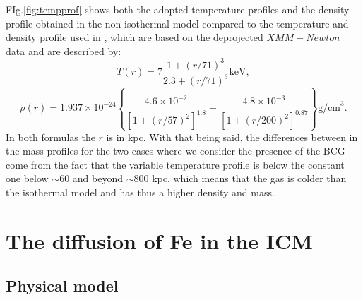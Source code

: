 \documentclass{article}
\begin{document}
FIg.\ref{fig:tempprof} shows both the adopted temperature profiles and the density profile obtained in the non-isothermal model compared to the temperature and density profile used in \cite{rebusco}, which are based on the deprojected $XMM-Newton$ data and are described by:
\begin{equation}
	T(r)=7\frac{1+(r/71)^{3}}{2.3+(r/71)^{3}}\text{keV},
\end{equation}
\begin{equation}
	\rho (r)=1.937\times 10^{-24}\left\{\frac{4.6\times 10^{-2}}{[1+(r/57)^{2}]^{1.8}}+\frac{4.8\times 10^{-3}}{[1+(r/200)^{2}]^{0.87}}\right\}\text{g/cm}^{3}.
\end{equation}
In both formulas the $r $ is in kpc. With that being said, the differences between in the mass profiles for the two cases where we consider the presence of the BCG come from the fact that the variable temperature profile is below the constant one below $\sim 60$ and beyond
$\sim 800$ kpc, which means that the gas is colder than the isothermal model and has thus a higher density and mass.

\section{The diffusion of Fe in the ICM}
\subsection{Physical model}
\end{document}
